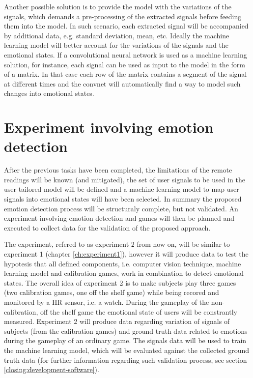 Another possible solution is to provide the model with the variations of the signals, which demands a pre-processing of the extracted signals before feeding them into the model. In such scenario, each extracted signal will be accompanied by additional data, e.g. standard deviation, mean, etc. Ideally the machine learning model will better account for the variations of the signals and the emotional states. If a convolutional neural network is used as a machine learning solution, for instance, each signal can be used as input to the model in the form of a matrix. In that case each row of the matrix contains a segment of the signal at different times and the convnet will automatically find a way to model such changes into emotional states.

\section{Experiment involving emotion detection}
\label{closing:emotion-detection-experiment}

After the previous tasks have been completed, the limitations of the remote readings will be known (and mitigated), the set of user signals to be used in the user-tailored model will be defined and a machine learning model to map user signals into emotional states will have been selected. In summary the proposed emotion detection process will be structuraly complete, but not validated. An experiment involving emotion detection and games will then be planned and executed to collect data for the validation of the proposed approach.

The experiment, refered to as experiment 2 from now on, will be similar to experiment 1 (chapter \ref{ch:experiment1}), however it will produce data to test the hypotesis that all defined components, i.e. computer vision technique, machine learning model and calibration games, work in combination to detect emotional states. The overall idea of experiment 2 is to make subjects play three games (two calibration games, one off the shelf game) while being recored and monitored by a HR sensor, i.e. a watch. During the gameplay of the non-calibration, off the shelf game the emotional state of users will be constrantly measured. Experiment 2 will produce data regarding variation of signals of subjects (from the calibration games) and ground truth data related to emotions during the gameplay of an ordinary game. The signals data will be used to train the machine learning model, which will be evaluated against the collected ground truth data (for further information regarding such validation process, see section \ref{closing:development-software}).

